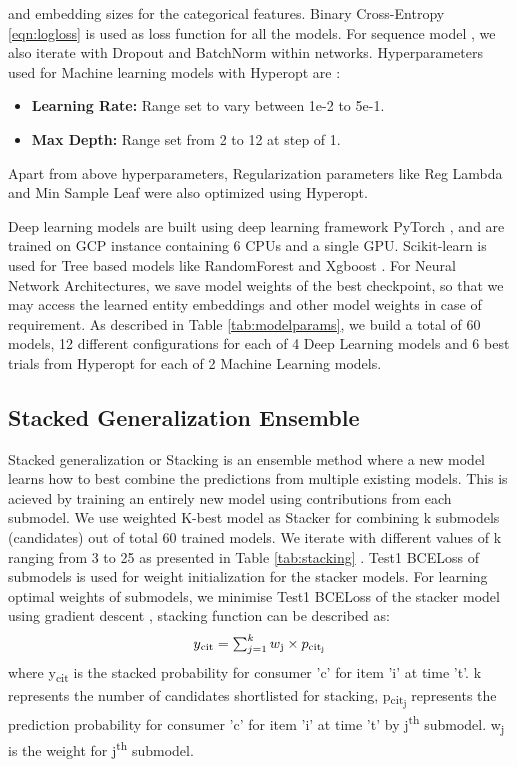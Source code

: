 and embedding sizes for the categorical features. Binary Cross-Entropy \ref{eqn:logloss} is used as loss 
function for all the models. For sequence model \cite{sutskever2014sequence}, we also iterate with
Dropout \cite{hinton2012improving} and BatchNorm \cite{santurkar2018does} within networks.
Hyperparameters used for Machine learning models with Hyperopt \cite{bergstra2013hyperopt} are :
  \begin{itemize}
    \item {\bf Learning Rate:} Range set to vary between 1e-2 to 5e-1. 
    \item {\bf Max Depth:} Range set from 2 to 12 at step of 1.
  \end{itemize}
Apart from above hyperparameters, Regularization parameters like Reg Lambda and Min Sample Leaf were also optimized using Hyperopt.

Deep learning models are built using deep learning framework
PyTorch \cite{paszke2017automatic}, and are trained on GCP instance containing 6 CPUs and a single GPU. 
Scikit-learn \cite{pedregosa2011scikit} is used for Tree
based models like RandomForest and Xgboost \cite{chen2016xgboost}. For Neural Network Architectures, 
we save model weights of the best checkpoint, so that we may access the learned entity embeddings and other
model weights in case of requirement. As described in Table \ref{tab:modelparams}, we build a total of 60 models, 
12 different configurations for each of 4 Deep Learning models and 6 best trials from Hyperopt \cite{bergstra2013hyperopt} 
for each of 2 Machine Learning models.
\subsection{Stacked Generalization Ensemble}
Stacked generalization or Stacking \cite{wolpert1992stacked} is an ensemble method where a new model learns how to best 
combine the predictions from multiple existing models. This is acieved by training an entirely new model using 
contributions from each submodel. 
We use weighted K-best model as Stacker for combining k submodels (candidates) out of total 60 
trained models. We iterate with different values of k ranging from 3 to 25 as presented in Table \ref{tab:stacking} . 
Test1 BCELoss of submodels is used for weight initialization for the stacker models. For learning optimal weights of submodels, 
we minimise Test1 BCELoss of the stacker model using gradient descent \cite{ruder2016overview}, 
stacking function can be described as:
  \begin{equation}
    \begin{array}{l}
      y\textsubscript{cit} =\sum_{j=1}^{k}w\textsubscript{j} \times p\textsubscript{cit\textsubscript{j}}
    \end{array}
    \label{eqn:stack}
  \end{equation}
where y\textsubscript{cit} is the stacked probability for consumer 'c' for item ’i’ at time ’t’.
k represents the number of candidates shortlisted for stacking, p\textsubscript{cit\textsubscript{j}}
represents the prediction probability for consumer 'c' for item ’i’ at time ’t’ by j\textsuperscript{th} submodel.
w\textsubscript{j} is the weight for j\textsuperscript{th} submodel.

